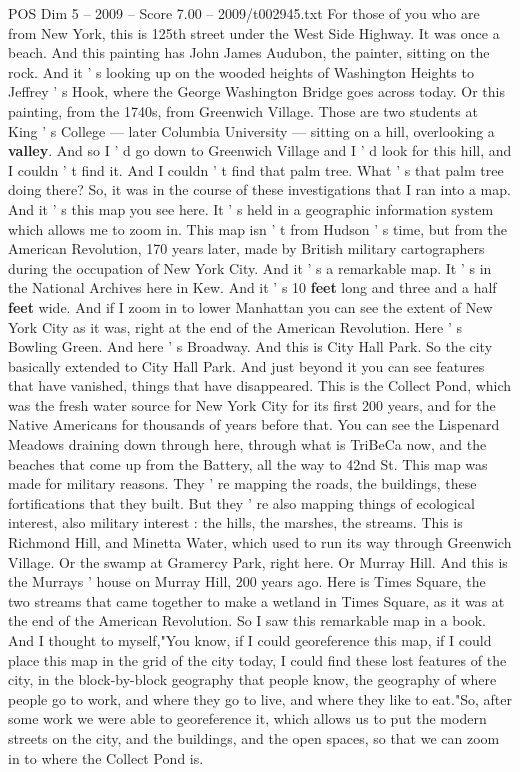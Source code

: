 \begin{textsample}{POS Dim 5 – 2009 – Score 7.00 – 2009/t002945.txt}
For those of you who are from New York, this is 125th street under the West Side Highway.
It was once a beach.
And this painting has John James Audubon, the painter, sitting on the rock.
And it ' s looking up on the wooded heights of Washington Heights to Jeffrey ' s Hook, where the George Washington Bridge goes across today.
Or this painting, from the 1740s, from Greenwich Village.
Those are two students at King ' s College — later Columbia University — sitting on a hill, overlooking a \textbf{valley}.
And so I ' d go down to Greenwich Village and I ' d look for this hill, and I couldn ' t find it.
And I couldn ' t find that palm tree.
What ' s that palm tree doing there?
So, it was in the course of these investigations that I ran into a map.
And it ' s this map you see here.
It ' s held in a geographic information system which allows me to zoom in.
This map isn ' t from Hudson ' s time, but from the American Revolution, 170 years later, made by British military cartographers during the occupation of New York City.
And it ' s a remarkable map.
It ' s in the National Archives here in Kew.
And it ' s 10 \textbf{feet} long and three and a half \textbf{feet} wide.
And if I zoom in to lower Manhattan you can see the extent of New York City as it was, right at the end of the American Revolution.
Here ' s Bowling Green.
And here ' s Broadway.
And this is City Hall Park.
So the city basically extended to City Hall Park.
And just beyond it you can see features that have vanished, things that have disappeared.
This is the Collect Pond, which was the fresh water source for New York City for its first 200 years, and for the Native Americans for thousands of years before that.
You can see the Lispenard Meadows draining down through here, through what is TriBeCa now, and the beaches that come up from the Battery, all the way to 42nd St.
This map was made for military reasons.
They ' re mapping the roads, the buildings, these fortifications that they built.
But they ' re also mapping things of ecological interest, also military interest : the hills, the marshes, the streams.
This is Richmond Hill, and Minetta Water, which used to run its way through Greenwich Village.
Or the swamp at Gramercy Park, right here.
Or Murray Hill.
And this is the Murrays ' house on Murray Hill, 200 years ago.
Here is Times Square, the two streams that came together to make a wetland in Times Square, as it was at the end of the American Revolution.
So I saw this remarkable map in a book.
And I thought to myself,"You know, if I could georeference this map, if I could place this map in the grid of the city today, I could find these lost features of the city, in the block-by-block geography that people know, the geography of where people go to work, and where they go to live, and where they like to eat."So, after some work we were able to georeference it, which allows us to put the modern streets on the city, and the buildings, and the open spaces, so that we can zoom in to where the Collect Pond is.

\end{textsample}
